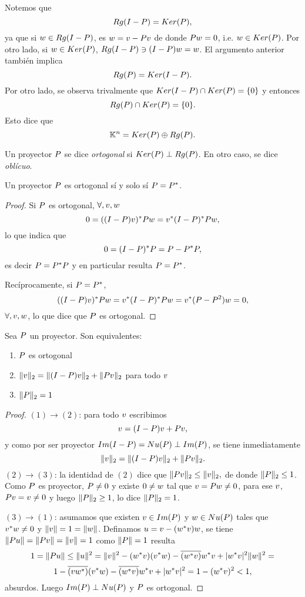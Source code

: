 Notemos que
$$Rg(\Ib-\Pb)=Ker(\Pb),$$
ya que si $\wb\in Rg(\Ib-\Pb)$, es $\wb=\vb-\Pb\vb$ de donde $\Pb\wb=\cero$, i.e. $\wb\in Ker(\Pb)$. Por otro lado, si $\wb\in Ker(\Pb)$,
$Rg(\Ib-\Pb)\ni (\Ib-\Pb)\wb=\wb$. El argumento anterior también implica
$$Rg(\Pb)=Ker(\Ib-\Pb).$$
Por otro lado, se observa trivalmente que  $Ker(\Ib-\Pb)\cap Ker(\Pb)=\{\cero\}$ y entonces
$$Rg(\Pb)\cap Ker(\Pb)=\{\cero\}.$$
Esto dice que
$$
\Kn=Ker(\Pb)\oplus Rg(\Pb).
$$
\tccdefi
\begin{definicion}
 Un proyector $\Pb$ se dice \emph{ortogonal} si $Ker(\Pb)\perp Rg(\Pb)$. En otro caso, se dice \emph{oblícuo}.
\end{definicion}
\etcc
\tcc
\begin{proposicion}
\label{prop:ortssiautoadjunto}
Un proyector $\Pb$ es ortogonal sí y solo sí $\Pb=\Pb^*$.
\end{proposicion}
\etcc
\begin{proof}
 Si $\Pb$ es ortogonal, $\forall, \vb,\wb$
 $$
 0=((\Ib-\Pb)\vb)^*\Pb\wb=\vb^*(\Ib-\Pb)^*\Pb\wb,
 $$
 lo que indica que
 $$
 \cero=(\Ib-\Pb)^*\Pb=\Pb-\Pb^*\Pb,
 $$
 es decir $\Pb=\Pb^*\Pb$ y en particular resulta $\Pb=\Pb^*$.

 Recíprocamente, si $\Pb=\Pb^*$,
 $$
 ((\Ib-\Pb)\vb)^*\Pb\wb=\vb^*(\Ib-\Pb)^*\Pb\wb=\vb^*(\Pb-\Pb^2)\wb=0,
 $$
 $\forall, \vb,\wb$, lo que dice que $\Pb$ es ortogonal.
\end{proof}

\tcc
\begin{teorema}
 Sea $\Pb$ un proyector. Son equivalentes:
 \begin{enumerate}
  \item $\Pb$ es ortogonal
  \item $\|\vb\|_2=\|(\Ib-\Pb)\vb\|_2+\|\Pb\vb\|_2$ para todo $\vb$
  \item $\|\Pb\|_2=1$
 \end{enumerate}
\end{teorema}
\etcc
\begin{proof}
 $(1)\rightarrow (2)$: para todo $\vb$ escribimos
 $$
 \vb=(\Ib-\Pb)\vb+\Pb\vb,
 $$
 y como por ser proyector $Im(\Ib-\Pb)=Nu(\Pb)\perp Im(\Pb)$, se tiene inmediatamente
 $$\|\vb\|_2=\|(\Ib-\Pb)\vb\|_2+\|\Pb\vb\|_2.$$
$(2)\rightarrow (3)$:
la identidad de $(2)$ dice que
$\|\Pb \vb\|_2\le \| \vb\|_2,$ de donde
$\|\Pb\|_2\le 1$. Como $\Pb$ es proyector,
$\Pb\neq \cero$ y existe $\cero\neq\wb$ tal que $\vb=\Pb\wb\neq\cero$, para ese $\vb$, $\Pb\vb=\vb\neq\cero$ y luego $\|\Pb\|_2\ge 1$, lo dice $\|\Pb\|_2= 1$.

\noindent $(3)\rightarrow (1)$: asumamos que existen $\vb\in Im(\Pb)$ y
$\wb\in Nu(\Pb)$ tales que $\vb^*\wb\neq 0$ y $\|\vb\|=1=\|\wb\|$. Definamos $\ub=\vb-(\wb^*\vb)\wb$, se tiene $\|\Pb\ub\|=\|\Pb\vb\|=\|\vb\|=1$ como $\|\Pb\|=1$ resulta
$$1=\|\Pb\ub\|\le \|\ub\|^2=\|\vb\|^2-
(\wb^*\vb)(\vb^*\wb)-\overline{(\wb^*\vb)}\wb^*\vb+|\wb^*\vb|^2\|\wb\|^2=
$$
$$
1-\overline{(\vb\wb^*)}(\vb^*\wb)-\overline{(\wb^*\vb)}\wb^*\vb+|\wb^*\vb|^2
=1-(\wb^*\vb)^2<1,
$$
absurdos. Luego $Im(\Pb)\perp Nu(\Pb)$ y $\Pb$ es ortogonal.
 \end{proof}

